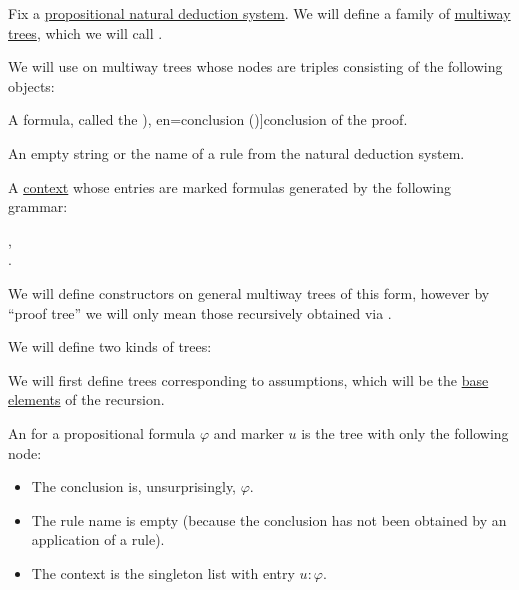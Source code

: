 \begin{definition}\label{def:natural_deduction_proof_tree}\mimprovised
  Fix a \hyperref[def:propositional_natural_deduction_system]{propositional natural deduction system}. We will define a family of \hyperref[def:multiway_tree]{multiway trees}, which we will call .

  We will use  on multiway trees whose nodes are triples consisting of the following objects:
  \begin{thmenum}[series=def:natural_deduction_proof_tree]
     A formula, called the \term[ru=conclusion (\cite[35]{TroelstraSchwichtenberg2000}), en=conclusion (\cite[36]{TroelstraSchwichtenberg2000})]{conclusion} of the proof.

     An empty string or the name of a rule from the natural deduction system.

     A \hyperref[def:logical_context]{context} whose entries are marked formulas generated by the following grammar:
    \begin{bnf*}
                {}, \\
        { \bnfsp \bnftsq{:} \bnfsp {}}.
    \end{bnf*}
  \end{thmenum}

  We will define constructors on general multiway trees of this form, however by \enquote{proof tree} we will only mean those recursively obtained via .

  We will define two kinds of trees:
  \begin{thmenum}[resume=def:natural_deduction_proof_tree]
     We will first define trees corresponding to assumptions, which will be the \hyperref[thm:least_fixed_point_recursion/base]{base elements} of the recursion.

    An  for a propositional formula \( \varphi \) and marker \( u \) is the tree with only the following node:
    \begin{itemize}
      \item The conclusion is, unsurprisingly, \( \varphi \).
      \item The rule name is empty (because the conclusion has not been obtained by an application of a rule).
      \item The context is the singleton list with entry \( u: \varphi \).
    \end{itemize}


\end{thmenum}
\end{definition}

